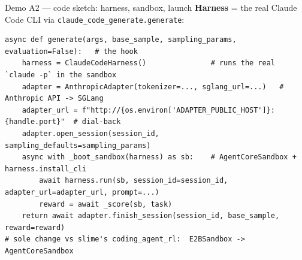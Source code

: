 \documentclass[aspectratio=169]{beamer}
\begin{document}
\begin{frame}[fragile]{Demo A2 --- code sketch: harness, sandbox, launch}
  \footnotesize\textbf{Harness} = the real Claude Code CLI via \texttt{claude\_code\_generate.generate}:
\begin{lstlisting}[basicstyle=\ttfamily\scriptsize]
async def generate(args, base_sample, sampling_params, evaluation=False):   # the hook
    harness = ClaudeCodeHarness()               # runs the real `claude -p` in the sandbox
    adapter = AnthropicAdapter(tokenizer=..., sglang_url=...)   # Anthropic API -> SGLang
    adapter_url = f"http://{os.environ['ADAPTER_PUBLIC_HOST']}:{handle.port}"  # dial-back
    adapter.open_session(session_id, sampling_defaults=sampling_params)
    async with _boot_sandbox(harness) as sb:    # AgentCoreSandbox + harness.install_cli
        await harness.run(sb, session_id=session_id, adapter_url=adapter_url, prompt=...)
        reward = await _score(sb, task)
    return await adapter.finish_session(session_id, base_sample, reward=reward)
# sole change vs slime's coding_agent_rl:  E2BSandbox -> AgentCoreSandbox
\end{lstlisting}
\end{frame}
\end{document}
